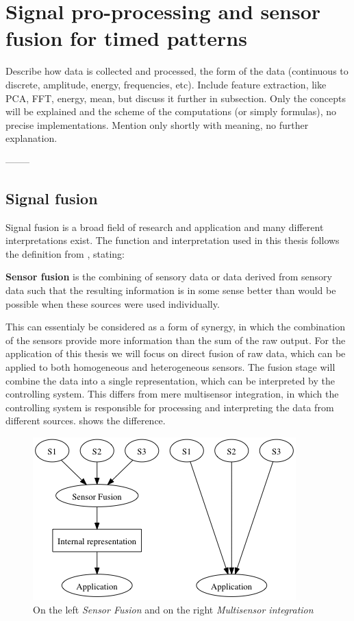 
\section{Signal pro-processing and sensor fusion for timed patterns}
  Describe how data is collected and processed, the form of the data (continuous to discrete, amplitude, energy, frequencies, etc).
  Include feature extraction, like PCA, FFT, energy, mean, but discuss it further in subsection.
  Only the concepts will be explained and the scheme of the computations (or simply formulas), no precise implementations.
  Mention only shortly with meaning, no further explanation.

  --------


    \subsection{Signal fusion}
    Signal fusion is a broad field of research and application and many different interpretations exist.
    The function and interpretation used in this thesis follows the definition from \cite{elmenreich2001introduction}, stating:
    \begin{center}
      \textbf{Sensor fusion} is the combining of sensory data or data derived from sensory data such that the resulting information is in some sense better than would be possible when these sources were used individually.
    \end{center}
    This can essentialy be considered as a form of synergy, in which the combination of the sensors provide more information than the sum of the raw output.
    For the application of this thesis we will focus on direct fusion of raw data, which can be applied to both homogeneous and heterogeneous sensors.
    The fusion stage will combine the data into a single representation, which can be interpreted by the controlling system.
    This differs from mere multisensor integration, in which the controlling system is responsible for processing and interpreting the data from different sources.
     shows the difference.

    \begin{figure}[htbp]
      \centering
        \includegraphics{./Figures/sensor_fusion.png}
      \caption[K-means]{On the left \emph{Sensor Fusion} and on the right \emph{Multisensor integration}}
      \label{fig:sensor_fusion}
    \end{figure}

